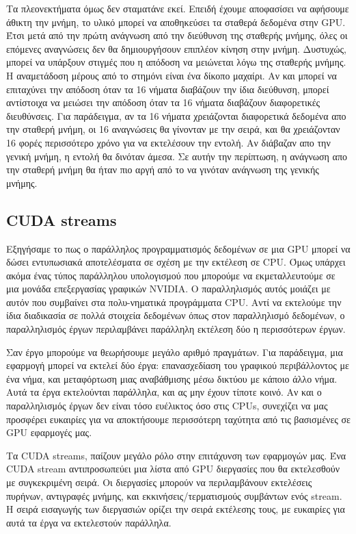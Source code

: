 Τα πλεονεκτήματα όμως δεν σταματάνε εκεί. Επειδή έχουμε αποφασίσει να αφήσουμε άθικτη την μνήμη, το υλικό μπορεί να αποθηκεύσει τα σταθερά δεδομένα στην GPU. Έτσι μετά από την πρώτη ανάγνωση από την διεύθυνση της σταθερής μνήμης, όλες οι επόμενες αναγνώσεις δεν θα δημιουργήσουν επιπλέον κίνηση στην μνήμη. Δυστυχώς, μπορεί να υπάρξουν στιγμές που η απόδοση να μειώνεται λόγω της σταθερής μνήμης. Η αναμετάδοση μέρους από το στημόνι είναι ένα δίκοπο μαχαίρι. Αν και μπορεί να επιταχύνει την απόδοση όταν τα 16 νήματα διαβάζουν την ίδια διεύθυνση, μπορεί αντίστοιχα να μειώσει την απόδοση όταν τα 16 νήματα διαβάζουν διαφορετικές διευθύνσεις. Για παράδειγμα, αν τα 16 νήματα χρειάζονται διαφορετικά δεδομένα απο την σταθερή μνήμη, οι 16 αναγνώσεις θα γίνονταν με την σειρά, και θα χρειάζονταν 16 φορές περισσότερο χρόνο για να εκτελέσουν την εντολή. Αν διάβαζαν απο την γενική μνήμη, η εντολή θα δινόταν άμεσα. Σε αυτήν την περίπτωση, η ανάγνωση απο την σταθερή μνήμη θα ήταν πιο αργή από το να γινόταν ανάγνωση της γενικής μνήμης.\cite{cuda-4}


\subsection{CUDA streams}
Εξηγήσαμε το πως ο παράλληλος προγραμματισμός δεδομένων σε μια GPU μπορεί να δώσει εντυπωσιακά αποτελέσματα σε σχέση με την εκτέλεση σε CPU. Όμως υπάρχει ακόμα ένας τύπος παράλληλου υπολογισμού που μπορούμε να εκμεταλλευτούμε σε μια μονάδα επεξεργασίας γραφικών NVIDIA. Ο παραλληλισμός αυτός μοιάζει με αυτόν που συμβαίνει στα πολυ-νηματικά προγράμματα CPU. Αντί να εκτελούμε την ίδια διαδικασία σε πολλά στοιχεία δεδομένων όπως στον παραλληλισμό δεδομένων, ο παραλληλισμός έργων περιλαμβάνει παράλληλη εκτέλεση δύο η περισσότερων έργων. 

Σαν έργο μπορούμε να θεωρήσουμε μεγάλο αριθμό πραγμάτων. Για παράδειγμα, μια εφαρμογή μπορεί να εκτελεί δύο έργα: επανασχεδίαση του γραφικού περιβάλλοντος με ένα νήμα, και μεταφόρτωση μιας αναβάθμισης μέσω δικτύου με κάποιο άλλο νήμα. Αυτά τα έργα εκτελούνται παράλληλα, και ας μην έχουν τίποτε κοινό. Αν και ο παραλληλισμός έργων δεν είναι τόσο ευέλικτος όσο στις CPUs, συνεχίζει να μας προσφέρει ευκαιρίες για να αποκτήσουμε περισσότερη ταχύτητα από τις βασισμένες σε GPU εφαρμογές μας.

Τα CUDA streams, παίζουν μεγάλο ρόλο στην επιτάχυνση των εφαρμογών μας. Ένα CUDA stream αντιπροσωπεύει μια λίστα από GPU διεργασίες που θα εκτελεσθούν με συγκεκριμένη σειρά. Οι διεργασίες μπορούν να περιλαμβάνουν εκτελέσεις πυρήνων, αντιγραφές μνήμης, και εκκινήσεις/τερματισμούς συμβάντων ενός stream. H σειρά εισαγωγής των διεργασιών ορίζει την σειρά εκτέλεσης τους, με ευκαιρίες για αυτά τα έργα να εκτελεστούν παράλληλα.

